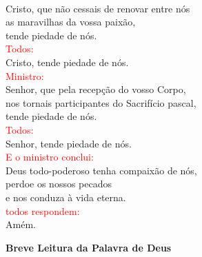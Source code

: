\documentclass{book}
\begin{document}
\begin{flushleft}
    \vspace{.1cm} \\
    Cristo, que não cessais de renovar entre nós \\
    as maravilhas da vossa paixão, \\
    tende piedade de nós.
    \vspace{.1cm} \\
    \textcolor{red}{Todos:}
    \vspace{.1cm} \\
    Cristo, tende piedade de nós.
    \vspace{.1cm} \\
    \textcolor{red}{Ministro:}
    \vspace{.1cm} \\
    Senhor, que pela recepção do vosso Corpo, \\
    nos tornais participantes do Sacrifício pascal, \\
    tende piedade de nós.
    \vspace{.1cm} \\
    \textcolor{red}{Todos:}
    \vspace{.1cm} \\
    Senhor, tende piedade de nós.
    \vspace{.1cm} \\
    \textcolor{red}{E o ministro conclui:}
    \vspace{.1cm} \\
    Deus todo-poderoso tenha compaixão de nós, \\
    perdoe os nossos pecados \\
    e nos conduza à vida eterna.
    \vspace{.1cm} \\
    \textcolor{red}{todos respondem:}
    \vspace{.1cm} \\
    Amém.
\end{flushleft}
\begin{center}
    \textbf{Breve Leitura da Palavra de Deus}
\end{center}
\end{document}
